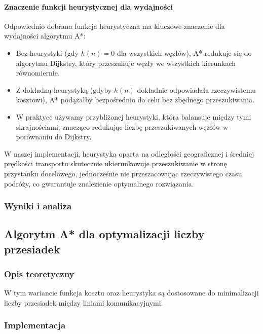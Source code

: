 \documentclass[12pt,a4paper]{article}
\begin{document}
\paragraph{Znaczenie funkcji heurystycznej dla wydajności}
Odpowiednio dobrana funkcja heurystyczna ma kluczowe znaczenie dla wydajności algorytmu A*:

\begin{itemize}
    \item Bez heurystyki (gdy $h(n) = 0$ dla wszystkich węzłów), A* redukuje się do algorytmu Dijkstry, który przeszukuje węzły we wszystkich kierunkach równomiernie.
    \item Z dokładną heurystyką (gdyby $h(n)$ dokładnie odpowiadała rzeczywistemu kosztowi), A* podążałby bezpośrednio do celu bez zbędnego przeszukiwania.
    \item W praktyce używamy przybliżonej heurystyki, która balansuje między tymi skrajnościami, znacząco redukując liczbę przeszukiwanych węzłów w porównaniu do Dijkstry.
\end{itemize}

W naszej implementacji, heurystyka oparta na odległości geograficznej i średniej prędkości transportu skutecznie ukierunkowuje przeszukiwanie w stronę przystanku docelowego, jednocześnie nie przeszacowując rzeczywistego czasu podróży, co gwarantuje znalezienie optymalnego rozwiązania.

\subsubsection{Wyniki i analiza}

\subsection{Algorytm A* dla optymalizacji liczby przesiadek}
\subsubsection{Opis teoretyczny}
W tym wariancie funkcja kosztu oraz heurystyka są dostosowane do minimalizacji liczby przesiadek między liniami komunikacyjnymi.

\subsubsection{Implementacja}
\end{document}
